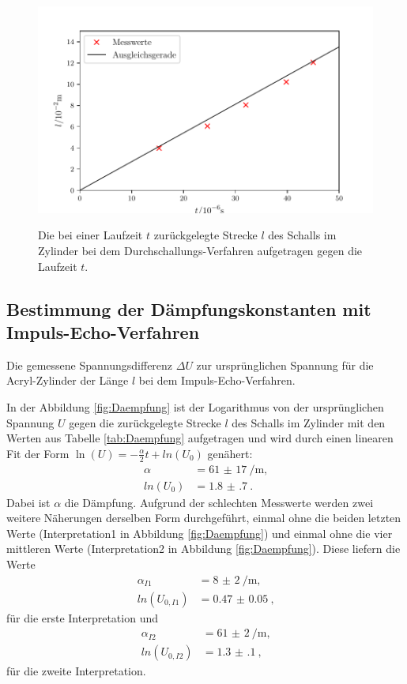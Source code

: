 \begin{figure}
	\centering
	\caption{Die bei einer Laufzeit $t$ zurückgelegte Strecke $l$ des Schalls im Zylinder bei dem Durchschallungs-Verfahren aufgetragen gegen die Laufzeit $t$.}
	\includegraphics[width=\linewidth-70pt,height=\textheight-70pt,keepaspectratio]{content/images/SchallgeschwindigkeitDurchschallung.pdf}
	\label{fig:SchallD}
\end{figure}

\subsection{Bestimmung der Dämpfungskonstanten mit Impuls-Echo-Verfahren}

\begin{table}
	\centering
	\caption{Die gemessene Spannungsdifferenz $\Delta U$ zur ursprünglichen Spannung für die Acryl-Zylinder der Länge $l$ bei dem Impuls-Echo-Verfahren.}
	
	\label{tab:Daempfung}
\end{table}

\noindent In der Abbildung \ref{fig:Daempfung} ist der Logarithmus von der ursprünglichen Spannung $U$ gegen die zurückgelegte Strecke $l$ des Schalls im Zylinder mit den Werten aus Tabelle \ref{tab:Daempfung} aufgetragen und wird durch einen linearen Fit der Form $\ln(U)=-\frac{\alpha}{2} t + ln(U_0)$ genähert:
\begin{align*}
	\alpha	&= \SI{61(17)}{\per\meter}\text{,}\\
	ln(U_0)	&=\SI{1.8(7)}{}\text{.}
\end{align*}
Dabei ist $\alpha$ die Dämpfung.
Aufgrund der schlechten Messwerte werden zwei weitere Näherungen derselben Form durchgeführt, einmal ohne die beiden letzten Werte (Interpretation1 in Abbildung \ref{fig:Daempfung}) und einmal ohne die vier mittleren Werte (Interpretation2 in Abbildung \ref{fig:Daempfung}). Diese liefern die Werte
\begin{align*}
	\alpha_{I1} &= \SI{8(2)}{\per\meter}\text{,}\\
	ln(U_{0,I1})&=\SI{0.47(5)}{}\text{,}
\end{align*} 
für die erste Interpretation und
\begin{align*}
	\alpha_{I2} &= \SI{61(2)}{\per\meter}\text{,}\\
	ln(U_{0,I2})&=\SI{1.3(1)}{}\text{,}
\end{align*}
für die zweite Interpretation.

